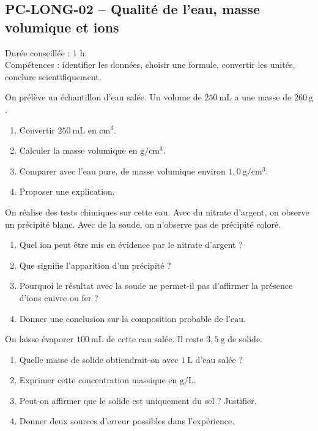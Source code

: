 \documentclass[11pt,a4paper]{article}
\newcounter{exercice}
\begin{document}
\subsection{PC-LONG-02 -- Qualité de l'eau, masse volumique et ions}

\begin{objectif}
Durée conseillée : 1 h.\\
Compétences : identifier les données, choisir une formule, convertir les unités, conclure scientifiquement.
\end{objectif}
\begin{exercice}
On prélève un échantillon d'eau salée. Un volume de $250\ \mathrm{mL}$ a une masse de $260\ \mathrm{g}$.
\begin{enumerate}
  \item Convertir $250\ \mathrm{mL}$ en $\mathrm{cm^3}$.
  \item Calculer la masse volumique en $\mathrm{g/cm^3}$.
  \item Comparer avec l'eau pure, de masse volumique environ $1{,}0\ \mathrm{g/cm^3}$.
  \item Proposer une explication.
\end{enumerate}
\end{exercice}

\begin{exercice}
On réalise des tests chimiques sur cette eau. Avec du nitrate d'argent, on observe un précipité blanc. Avec de la soude, on n'observe pas de précipité coloré.
\begin{enumerate}
  \item Quel ion peut être mis en évidence par le nitrate d'argent ?
  \item Que signifie l'apparition d'un précipité ?
  \item Pourquoi le résultat avec la soude ne permet-il pas d'affirmer la présence d'ions cuivre ou fer ?
  \item Donner une conclusion sur la composition probable de l'eau.
\end{enumerate}
\end{exercice}

\begin{exercice}
On laisse évaporer $100\ \mathrm{mL}$ de cette eau salée. Il reste $3{,}5\ \mathrm{g}$ de solide.
\begin{enumerate}
  \item Quelle masse de solide obtiendrait-on avec $1\ \mathrm{L}$ d'eau salée ?
  \item Exprimer cette concentration massique en $\mathrm{g/L}$.
  \item Peut-on affirmer que le solide est uniquement du sel ? Justifier.
  \item Donner deux sources d'erreur possibles dans l'expérience.
\end{enumerate}
\end{exercice}
\newpage
\end{document}

